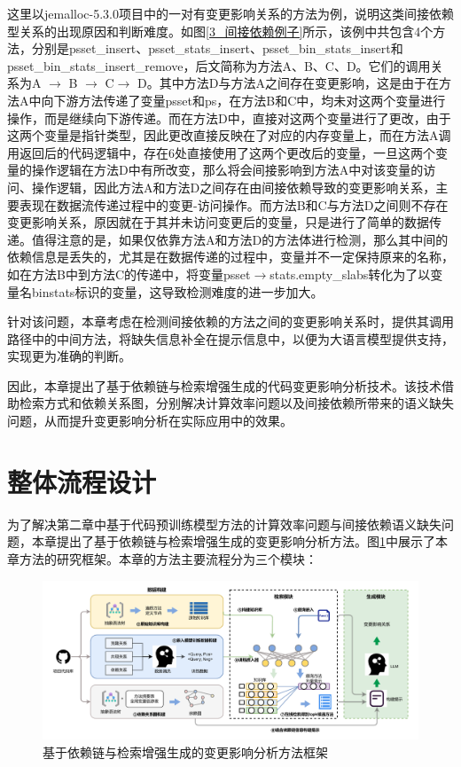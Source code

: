 这里以jemalloc-5.3.0项目中的一对有变更影响关系的方法为例，说明这类间接依赖型关系的出现原因和判断难度。如图\ref{3_间接依赖例子}所示，该例中共包含4个方法，分别是psset\_insert、psset\_stats\_insert、psset\_bin\_stats\_insert和psset\_bin\_stats\_insert\_remove，后文简称为方法A、B、C、D。它们的调用关系为A $\rightarrow$ B $\rightarrow$ C$\rightarrow$ D。其中方法D与方法A之间存在变更影响，这是由于在方法A中向下游方法传递了变量psset和ps，在方法B和C中，均未对这两个变量进行操作，而是继续向下游传递。而在方法D中，直接对这两个变量进行了更改，由于这两个变量是指针类型，因此更改直接反映在了对应的内存变量上，而在方法A调用返回后的代码逻辑中，存在6处直接使用了这两个更改后的变量，一旦这两个变量的操作逻辑在方法D中有所改变，那么将会间接影响到方法A中对该变量的访问、操作逻辑，因此方法A和方法D之间存在由间接依赖导致的变更影响关系，主要表现在数据流传递过程中的变更-访问操作。而方法B和C与方法D之间则不存在变更影响关系，原因就在于其并未访问变更后的变量，只是进行了简单的数据传递。值得注意的是，如果仅依靠方法A和方法D的方法体进行检测，那么其中间的依赖信息是丢失的，尤其是在数据传递的过程中，变量并不一定保持原来的名称，如在方法B中到方法C的传递中，将变量psset$\rightarrow$stats.empty\_slabs转化为了以变量名binstats标识的变量，这导致检测难度的进一步加大。


针对该问题，本章考虑在检测间接依赖的方法之间的变更影响关系时，提供其调用路径中的中间方法，将缺失信息补全在提示信息中，以便为大语言模型提供支持，实现更为准确的判断。

因此，本章提出了基于依赖链与检索增强生成的代码变更影响分析技术。该技术借助检索方式和依赖关系图，分别解决计算效率问题以及间接依赖所带来的语义缺失问题，从而提升变更影响分析在实际应用中的效果。

\section{整体流程设计}

为了解决第二章中基于代码预训练模型方法的计算效率问题与间接依赖语义缺失问题，本章提出了基于依赖链与检索增强生成的变更影响分析方法。图\ref{2_基于代码依赖与检索增强生成的变更影响分析方法框架}中展示了本章方法的研究框架。本章的方法主要流程分为三个模块：

\begin{figure}[htbp]
\centering
\includegraphics[width = 1\textwidth]{figures/3_第三章框架.pdf}
\caption{基于依赖链与检索增强生成的变更影响分析方法框架}
\label{2_基于代码依赖与检索增强生成的变更影响分析方法框架}
\end{figure}

